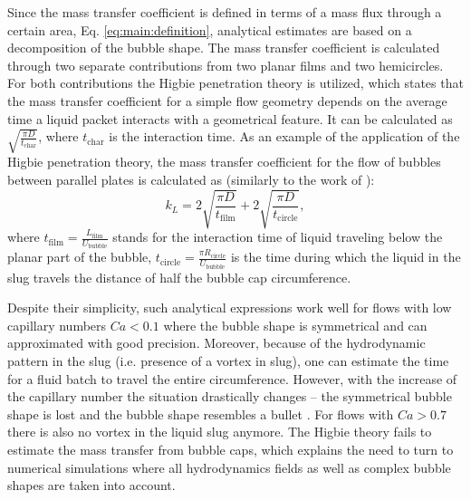 \documentclass{article}
\newcommand{\beq}{\begin{equation}}
\newcommand{\feq}{\end{equation}}
\newcommand{\lfilm}{L_{\mathrm{film}}}
\newcommand{\ububble}{U_{\mathrm{bubble}}}
\begin{document}
Since the mass transfer coefficient is defined in terms of a mass flux through a certain area, Eq. \ref{eq:main:definition},
analytical estimates \cite{kreutzer-overview,irandoust} are based on a decomposition of the bubble shape. The mass
 transfer coefficient is calculated through two separate contributions from two planar films and two hemicircles. For both 
contributions the Higbie penetration theory \cite{higbie} is utilized, which states that the mass transfer coefficient
 for a simple flow geometry depends on the average time a liquid packet interacts with a geometrical feature. It 
can be calculated as $\sqrt{\frac{\pi D}{t_{\mathrm{char}}}}$, where $t_{\mathrm{char}}$ is the interaction 
time. As an example of the application of the Higbie penetration theory,
 the mass  transfer coefficient 
for the flow of bubbles between parallel plates  is calculated as (similarly to the work of \citet{vanbaten-circular}):
\beq
k_L=2 \sqrt{\frac{\pi D}{t_{\mathrm{film}}}}+2 \sqrt{\frac{\pi D}{t_{\mathrm{circle}}}},
\feq
where $t_{\mathrm{film}}=\frac{\lfilm}{\ububble}$ stands for the interaction time of liquid traveling below the planar part
 of the bubble, $t_{\mathrm{circle}}=\frac{\pi R_{\mathrm{circle}}}{\ububble}$ is the time during which the liquid in the slug travels the distance of half the bubble cap circumference. 

Despite their simplicity, such analytical expressions work well for flows with low
capillary numbers $Ca<0.1$ \cite{bercic-mass} where the bubble shape is
symmetrical and can approximated with good precision. Moreover, because of the
hydrodynamic pattern in the slug (i.e. presence of a vortex in slug), one can
estimate the time for a fluid batch to travel the entire circumference.   However,
with the increase of the capillary number the situation drastically changes -- the
symmetrical bubble shape is lost and the bubble shape resembles a bullet \cite{kuzmin-binary2d}.
For flows with $Ca>0.7$ there is also no vortex in the liquid slug anymore. The Higbie theory fails
to estimate the mass transfer from bubble caps, which explains the need to turn to numerical simulations where all
hydrodynamics fields as well as complex bubble shapes are taken into account.
\end{document}
